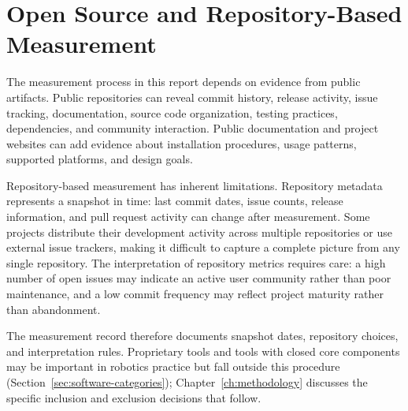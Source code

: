 \section{Open Source and Repository-Based Measurement}
\label{sec:open-source-repository-measurement}

The measurement process in this report depends on evidence from public artifacts. Public repositories can reveal commit history, release activity, issue tracking, documentation, source code organization, testing practices, dependencies, and community interaction. Public documentation and project websites can add evidence about installation procedures, usage patterns, supported platforms, and design goals.

Repository-based measurement has inherent limitations. Repository metadata represents a snapshot in time: last commit dates, issue counts, release information, and pull request activity can change after measurement. Some projects distribute their development activity across multiple repositories or use external issue trackers, making it difficult to capture a complete picture from any single repository. The interpretation of repository metrics requires care: a high number of open issues may indicate an active user community rather than poor maintenance, and a low commit frequency may reflect project maturity rather than abandonment.

The measurement record therefore documents snapshot dates, repository choices, and interpretation rules. Proprietary tools and tools with closed core components may be important in robotics practice but fall outside this procedure (Section~\ref{sec:software-categories}); Chapter~\ref{ch:methodology} discusses the specific inclusion and exclusion decisions that follow.
